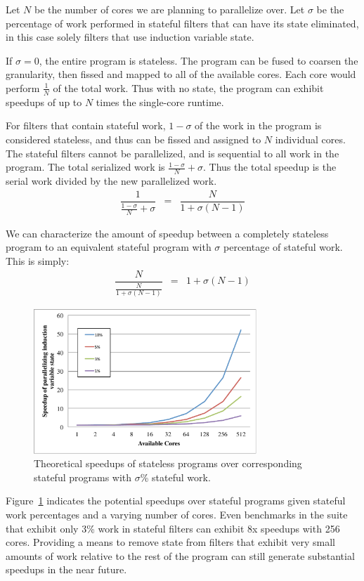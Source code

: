 Let $N$ be the number of cores we are planning to parallelize over.  Let $\sigma$ be the percentage of work performed in stateful filters that can have its state eliminated, in this case solely filters that use induction variable state.  

If $\sigma = 0$, the entire program is stateless.  The program can be fused to coarsen the granularity, then fissed and mapped to all of the available cores.  Each core would perform $\frac{1}{N}$ of the total work.  Thus with no state, the program can exhibit speedups of up to $N$ times the single-core runtime.

For filters that contain stateful work, $1-\sigma$ of the work in the program is considered stateless, and thus can be fissed and assigned to $N$ individual cores.  The stateful filters cannot be parallelized, and is sequential to all work in the program.  The total serialized work is $\frac{1-\sigma}{N} + \sigma$.  Thus the total speedup is the serial work divided by the new parallelized work.  
\begin{eqnarray*}
\dfrac{1}{\frac{1-\sigma}{N} + \sigma} &=& \dfrac{N}{1 + \sigma(N-1)}
\end{eqnarray*}

We can characterize the amount of speedup between a completely stateless program to an equivalent stateful program with $\sigma$ percentage of stateful work.  This is simply:
\begin{eqnarray*}
\dfrac{N}{\frac{N}{1 + \sigma(N-1)}} &=& 1 + \sigma(N-1)
\end{eqnarray*}

\begin{figure}[t!]
\includegraphics[width=3.3in]{figures/theoretic-speedup.pdf}
\caption{Theoretical speedups of stateless programs over corresponding stateful programs with $\sigma$\% stateful work.  \protect\label{fig:theo-speedups}}
\end{figure}

Figure~\ref{fig:theo-speedups} indicates the potential speedups over stateful programs given stateful work percentages and a varying number of cores.  Even benchmarks in the suite that exhibit only 3\% work in stateful filters can exhibit 8x speedups with 256 cores.  Providing a means to remove state from filters that exhibit very small amounts of work relative to the rest of the program can still generate substantial speedups in the near future.

